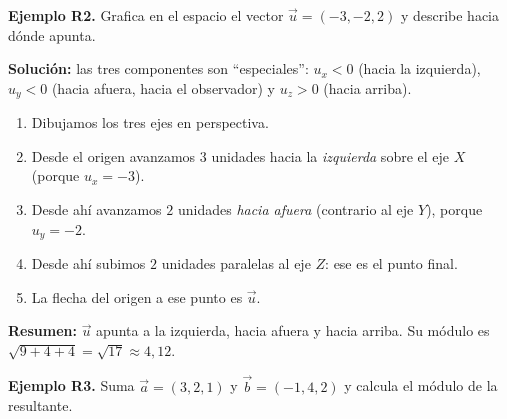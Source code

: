 \documentclass[12pt, letterpaper]{article}
\begin{document}
\textbf{Ejemplo R2.} Grafica en el espacio el vector $\vec{u} = (-3, -2, 2)$ y describe hacia dónde apunta.

\begin{cuadrosolucion}
  \textbf{Solución:} las tres componentes son ``especiales'': $u_x < 0$ (hacia la izquierda), $u_y < 0$ (hacia afuera, hacia el observador) y $u_z > 0$ (hacia arriba).
  \begin{enumerate}[leftmargin=*, label=\arabic*.]
    \item Dibujamos los tres ejes en perspectiva.
    \item Desde el origen avanzamos $3$ unidades hacia la \emph{izquierda} sobre el eje $X$ (porque $u_x = -3$).
    \item Desde ahí avanzamos $2$ unidades \emph{hacia afuera} (contrario al eje $Y$), porque $u_y = -2$.
    \item Desde ahí subimos $2$ unidades paralelas al eje $Z$: ese es el punto final.
    \item La flecha del origen a ese punto es $\vec{u}$.
  \end{enumerate}
  \begin{center}
  \end{center}
  \textbf{Resumen:} $\vec{u}$ apunta a la izquierda, hacia afuera y hacia arriba. Su módulo es $\sqrt{9 + 4 + 4} = \sqrt{17} \approx 4{,}12$.
\end{cuadrosolucion}

\textbf{Ejemplo R3.} Suma $\vec{a} = (3, 2, 1)$ y $\vec{b} = (-1, 4, 2)$ y calcula el módulo de la resultante.
\end{document}
